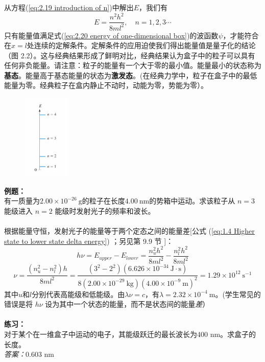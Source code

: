 	\indent 从方程(\ref{eq:2.19 introduction of n})中解出$E$，我们有
	\begin{equation}
		\boxed{
			E = \frac{n^2h^2}{8ml^2}, \quad n = 1,2,3 \cdots
		}
		\label{eq:2.20 energy of one-dimensional box}
	\end{equation}
	\indent 只有能量值满足式(\ref{eq:2.20 energy of one-dimensional box})的波函数$\psi$，才能符合在$x=l$处连续的定解条件。定解条件的应用迫使我们得出能量值是量子化的结论（图 2.2）。这与经典结果形成了鲜明对比，经典结果认为盒子中的粒子可以具有任何非负能量。请注意：粒子的能量有一个大于零的最小值。能量最小的状态称为\textbf{基态}。能量高于基态能量的状态为\textbf{激发态}。(在经典力学中，粒子在盒子中的最低能量为零。经典粒子在盒内静止不动时，动能为零，势能为零）。
	\begin{figure}[h!]
		\centering
		\includegraphics[width=0.2\textwidth]{Figures/2.2.png}  %
		\caption{}
		\label{fig:2.2}
	\end{figure}
	\begin{examplebox}
		\textbf{例题：}\\
		有一质量为$2.00\times10^{-26}\: \mathrm{g}$的粒子在长度$4.00 \: \mathrm{nm}$的势箱中运动。求该粒子从 $n=3$ 能级进入 $n=2$ 能级时发射光子的频率和波长。\\
		\\
		\indent 根据能量守恒，发射光子的能量等于两个定态之间的能量差[公式 (\ref{eq:1.4 Higher state to lower state delta energy}) ；另见第 9.9 节 ]：
		\begin{equation*}
			h\nu = E_{upper}-E_{lower}=\frac{n_u^2h^2}{8ml^2} - \frac{n_l^2h^2}{8ml^2}
		\end{equation*}
		\begin{equation*}
			\nu = \frac{\left(n_u^2-n_l^2\right)h}{8ml^2} = \frac{\left(3^2-2^2\right)\left(6.626 \times 10^{-34} \: \mathrm{J}\cdot\mathrm{s}\right)}{8\left(2.00 \times 10^{-29} \:  \mathrm{kg}\right)\left(4.00 \times 10^{-9} \: \mathrm{m}\right)^2} = 1.29 \times 10^{12} \: \mathrm{s}^{-1}
		\end{equation*}
		其中$u$和$l$分别代表高能级和低能级。由$\lambda \nu =c$，有$\lambda = 2.32 \times 10^{-4} \: \mathrm{m}$。(学生常见的错误是将 $h\nu$ 设为其中一个状态的能量，而不是状态间的能量\textit{差}）\\
		\\
		\textbf{练习：}\\
		对于某个在一维盒子中运动的电子，其能级跃迁的最长波长为400 nm。求盒子的长度。\\
		\textit{答案：}0.603 nm
	\end{examplebox}
